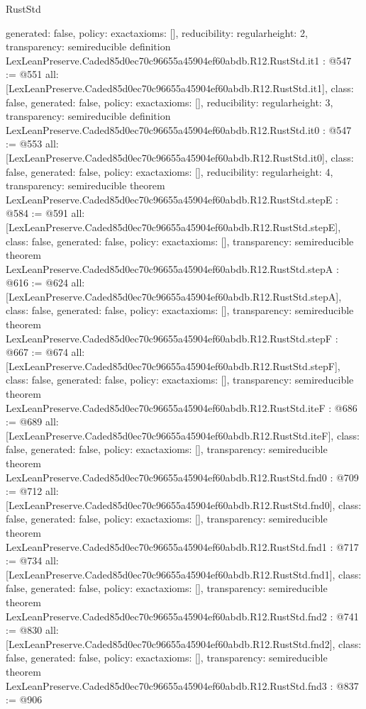 \begin{lexlean}{RustStd}
\begin{coremodule}
{  generated: false,
  policy: exact{axioms: []},
  reducibility: regular{height: 2},
  transparency: semireducible
}
definition LexLeanPreserve.Caded85d0ec70c96655a45904ef60abdb.R12.RustStd.it1 : @547 := @551 {
  all: [LexLeanPreserve.Caded85d0ec70c96655a45904ef60abdb.R12.RustStd.it1],
  class: false,
  generated: false,
  policy: exact{axioms: []},
  reducibility: regular{height: 3},
  transparency: semireducible
}
definition LexLeanPreserve.Caded85d0ec70c96655a45904ef60abdb.R12.RustStd.it0 : @547 := @553 {
  all: [LexLeanPreserve.Caded85d0ec70c96655a45904ef60abdb.R12.RustStd.it0],
  class: false,
  generated: false,
  policy: exact{axioms: []},
  reducibility: regular{height: 4},
  transparency: semireducible
}
theorem LexLeanPreserve.Caded85d0ec70c96655a45904ef60abdb.R12.RustStd.stepE : @584 := @591 {
  all: [LexLeanPreserve.Caded85d0ec70c96655a45904ef60abdb.R12.RustStd.stepE],
  class: false,
  generated: false,
  policy: exact{axioms: []},
  transparency: semireducible
}
theorem LexLeanPreserve.Caded85d0ec70c96655a45904ef60abdb.R12.RustStd.stepA : @616 := @624 {
  all: [LexLeanPreserve.Caded85d0ec70c96655a45904ef60abdb.R12.RustStd.stepA],
  class: false,
  generated: false,
  policy: exact{axioms: []},
  transparency: semireducible
}
theorem LexLeanPreserve.Caded85d0ec70c96655a45904ef60abdb.R12.RustStd.stepF : @667 := @674 {
  all: [LexLeanPreserve.Caded85d0ec70c96655a45904ef60abdb.R12.RustStd.stepF],
  class: false,
  generated: false,
  policy: exact{axioms: []},
  transparency: semireducible
}
theorem LexLeanPreserve.Caded85d0ec70c96655a45904ef60abdb.R12.RustStd.iteF : @686 := @689 {
  all: [LexLeanPreserve.Caded85d0ec70c96655a45904ef60abdb.R12.RustStd.iteF],
  class: false,
  generated: false,
  policy: exact{axioms: []},
  transparency: semireducible
}
theorem LexLeanPreserve.Caded85d0ec70c96655a45904ef60abdb.R12.RustStd.fnd0 : @709 := @712 {
  all: [LexLeanPreserve.Caded85d0ec70c96655a45904ef60abdb.R12.RustStd.fnd0],
  class: false,
  generated: false,
  policy: exact{axioms: []},
  transparency: semireducible
}
theorem LexLeanPreserve.Caded85d0ec70c96655a45904ef60abdb.R12.RustStd.fnd1 : @717 := @734 {
  all: [LexLeanPreserve.Caded85d0ec70c96655a45904ef60abdb.R12.RustStd.fnd1],
  class: false,
  generated: false,
  policy: exact{axioms: []},
  transparency: semireducible
}
theorem LexLeanPreserve.Caded85d0ec70c96655a45904ef60abdb.R12.RustStd.fnd2 : @741 := @830 {
  all: [LexLeanPreserve.Caded85d0ec70c96655a45904ef60abdb.R12.RustStd.fnd2],
  class: false,
  generated: false,
  policy: exact{axioms: []},
  transparency: semireducible
}
theorem LexLeanPreserve.Caded85d0ec70c96655a45904ef60abdb.R12.RustStd.fnd3 : @837 := @906 {
}
\end{coremodule}
\end{lexlean}
